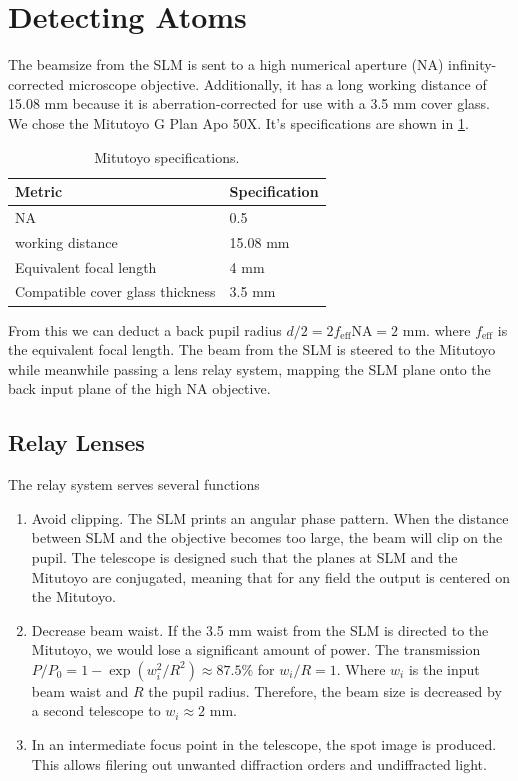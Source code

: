 \section{Detecting Atoms}

The beamsize from the SLM is sent to a high numerical aperture (NA) infinity-corrected microscope objective. Additionally, it has a long working distance of 15.08 mm because it is aberration-corrected for use with a 3.5 mm cover glass. We chose the Mitutoyo G Plan Apo 50X. It's specifications are shown in \cref{table:MitutoyoSpecs}.      

\begin{table}[h]
    \caption{Mitutoyo specifications.}
    \label{table:MitutoyoSpecs}
    \centering
    \begin{tabular}{l | l}
        \textbf{Metric}                  & \textbf{Specification} \\ \hline
        NA                               & 0.5                    \\ \hline
        working distance                 & 15.08 mm               \\ \hline
        Equivalent focal length          & 4 mm                   \\ \hline
        Compatible cover glass thickness & 3.5 mm                
    \end{tabular}
\end{table}

From this we can deduct a back pupil radius $d/2 = 2 f_{\text{eff}} \text{NA} = 2$ mm. where $f_\text{{eff}}$ is the equivalent focal length. The beam from the SLM is steered to the Mitutoyo while meanwhile passing a lens relay system, mapping the SLM plane onto the back input plane of the high NA objective. 

\subsection{Relay Lenses}

The relay system serves several functions

\begin{enumerate}
    \item Avoid clipping. The SLM prints an angular phase pattern. When the distance between SLM and the objective becomes too large, the beam will clip on the pupil. The telescope is designed such that the planes at SLM and the Mitutoyo are conjugated, meaning that for any field the output is centered on the Mitutoyo. 
     
    \item Decrease beam waist. If the 3.5 mm waist from the SLM is directed to the Mitutoyo, we would lose a significant amount of power. The transmission $P/P_0 = 1- \exp{(w_i^2/R^2)} \approx 87.5\%$ for $w_i/R = 1$. Where $w_i$ is the input beam waist and $R$ the pupil radius. Therefore, the beam size is decreased by a second telescope to $w_i \approx 2$ mm.
    
    \item In an intermediate focus point in the telescope, the spot image is produced. This allows filering out unwanted diffraction orders and undiffracted light. 
\end{enumerate}

